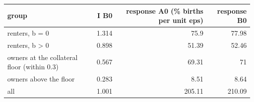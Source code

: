 \begin{tabular}{lrrr}
\toprule
group & I B0 & response A0 (\% births per unit eps) & response B0 \\
\midrule
renters, b = 0 & 1.314 & 75.9 & 77.98 \\
renters, b > 0 & 0.898 & 51.39 & 52.46 \\
owners at the collateral floor (within 0.3) & 0.567 & 69.31 & 71 \\
owners above the floor & 0.283 & 8.51 & 8.64 \\
all & 1.001 & 205.11 & 210.09 \\
\bottomrule
\end{tabular}
